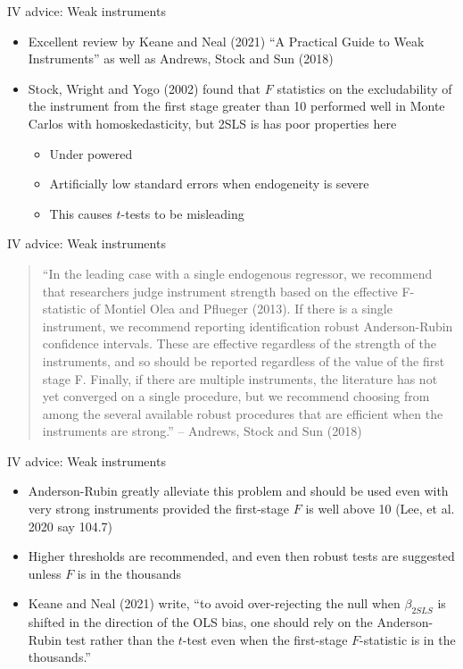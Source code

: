 \documentclass{beamer}
\begin{document}
\begin{frame}{IV advice: Weak instruments}

  \begin{itemize}
    \item Excellent review by Keane and Neal (2021) ``A Practical Guide to Weak Instruments''  as well as Andrews, Stock and Sun (2018)
    \item Stock, Wright and Yogo (2002) found that $F$ statistics on the excludability of the instrument from the first stage greater than 10 performed well in Monte Carlos with homoskedasticity, but 2SLS is has poor properties here
          \begin{itemize}
            \item Under powered
            \item Artificially low standard errors when endogeneity is severe
            \item This causes $t$-tests to be misleading
          \end{itemize}
  \end{itemize}

\end{frame}

\begin{frame}{IV advice: Weak instruments}

  \begin{quote}
    ``In the leading case with a single endogenous regressor, we recommend that researchers judge instrument strength based on the effective F-statistic of Montiel Olea and Pflueger (2013).  If there is a single instrument, we recommend reporting identification robust Anderson-Rubin confidence intervals. These are effective regardless of the strength of the instruments, and so should be reported regardless of the value of the first stage F.  Finally, if there are multiple instruments, the literature has not yet converged on a single procedure, but we recommend choosing from among the several available robust procedures that are efficient when the instruments are strong.'' -- Andrews, Stock and Sun (2018)
  \end{quote}

\end{frame}


\begin{frame}{IV advice: Weak instruments}

  \begin{itemize}
    \item Anderson-Rubin greatly alleviate this problem and should be used even with very strong instruments provided the first-stage $F$ is well above 10 (Lee, et al. 2020 say 104.7)
    \item Higher thresholds are recommended, and even then robust tests are suggested unless $F$ is in the thousands
    \item Keane and Neal (2021) write, ``to avoid over-rejecting the null when $\beta_{2SLS}$ is shifted in the direction of the OLS bias, one should rely on the Anderson-Rubin test rather than the $t$-test even when the first-stage $F$-statistic is in the thousands.''
  \end{itemize}

\end{frame}
\end{document}
